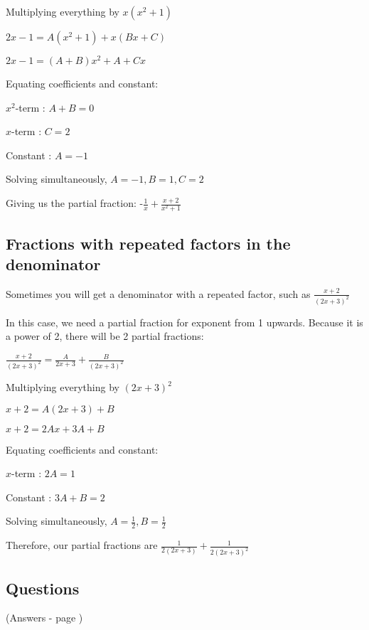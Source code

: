 \documentclass[../main.tex]{subfiles}
\begin{document}
Multiplying everything by $x(x^2+1)$

$2x-1=A(x^2+1)+x(Bx+C)$

$2x-1=(A+B)x^2+A+Cx$

Equating coefficients and constant:

$x^2$-term : $A+B=0$

$x$-term : $C=2$

Constant : $A=-1$

Solving simultaneously, $A=-1, B=1, C=2$

Giving us the partial fraction: -$\frac{1}{x}+\frac{x+2}{x^2+1}$

\subsection*{Fractions with repeated factors in the denominator}
Sometimes you will get a denominator with a repeated factor, such as $\frac{x+2}{(2x+3)^2}$

In this case, we need a partial fraction for exponent from 1 upwards. Because it is a power of 2, there will be 2 partial fractions:

$\frac{x+2}{(2x+3)^2}=\frac{A}{2x+3}+\frac{B}{(2x+3)^2}$

Multiplying everything by $(2x+3)^2$

$x+2=A(2x+3)+B$

$x+2=2Ax+3A+B$

Equating coefficients and constant:

$x$-term : $2A=1$

Constant : $3A+B=2$

Solving simultaneously, $A=\frac{1}{2}, B=\frac{1}{2}$

Therefore, our partial fractions are $\frac{1}{2(2x+3)}+\frac{1}{2(2x+3)^2}$



\pagebreak

\subsection*{Questions}
(Answers - page \pageref*{Partial fractions answers})
\label{partial fractions}
\end{document}

